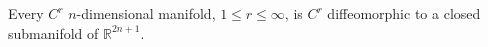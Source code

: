 Every $C^r$ $n$-dimensional manifold, $1 \leqslant r \leqslant \infty$, is $C^r$ diffeomorphic to a closed submanifold of $\mathbb{R}^{2n+1}$.
